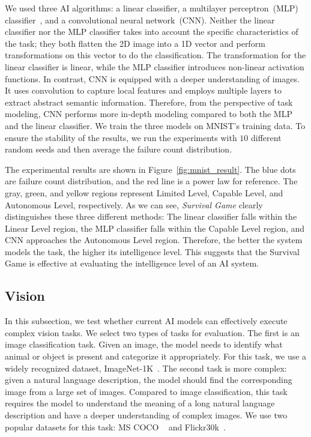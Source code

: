 We used three AI algorithms: a linear classifier, a multilayer perceptron~(MLP) classifier~\citep{haykin1994neural}, and a convolutional neural network~(CNN). Neither the linear classifier nor the MLP classifier takes into account the specific characteristics of the task; they both flatten the 2D image into a 1D vector and perform transformations on this vector to do the classification. The transformation for the linear classifier is linear, while the MLP classifier introduces non-linear activation functions. In contrast, CNN is equipped with a deeper understanding of images. It uses convolution to capture local features and employs multiple layers to extract abstract semantic information. Therefore, from the perspective of task modeling, CNN performs more in-depth modeling compared to both the MLP and the linear classifier. We train the three models on MNIST's training data. To ensure the stability of the results, we run the experiments with $10$ different random seeds and then average the failure count distribution.  

The experimental results are shown in Figure~\ref{fig:mnist_result}. The blue dots are failure count distribution, and the red line is a power law for reference. The gray, green, and yellow regions represent Limited Level, Capable Level, and Autonomous Level, respectively. As we can see, \textit{Survival Game} clearly distinguishes these three different methods: The linear classifier falls within the Linear Level region, the MLP classifier falls within the Capable Level region, and CNN approaches the Autonomous Level region. Therefore, the better the system models the task, the higher its intelligence level. This suggests that the Survival Game is effective at evaluating the intelligence level of an AI system.


\subsection{Vision}


In this subsection, we test whether current AI models can effectively execute complex vision tasks. We select two types of tasks for evaluation. The first is an image classification task. Given an image, the model needs to identify what animal or object is present and categorize it appropriately. For this task, we use a widely recognized dataset, ImageNet-1K~\citep{deng2009imagenet}. The second task is more complex: given a natural language description, the model should find the corresponding image from a large set of images. Compared to image classification, this task requires the model to understand the meaning of a long natural language description and have a deeper understanding of complex images. We use two popular datasets for this task: MS COCO ~\citep{lin2014microsoft} and Flickr30k~\citep{plummer2015flickr30k}.

